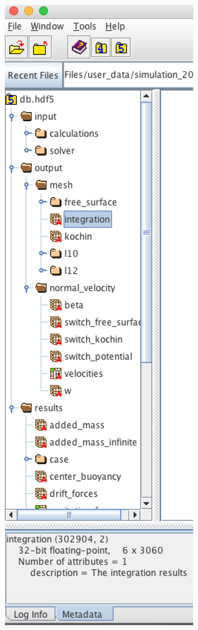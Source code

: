 \documentclass[12pt]{article}
\begin{document}
\vspace{\abovedisplayskip}
\begin{minipage}{\linewidth}
	\centering
	\includegraphics[scale=0.5]{img/32}
\end{minipage}
\vspace{\belowdisplayskip}
\end{document}
